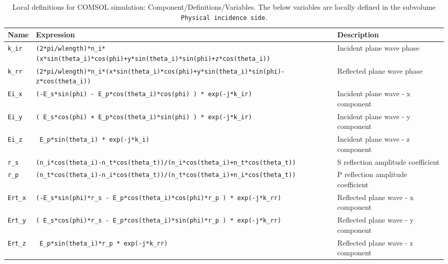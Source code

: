 \begin{sidewaystable}
 \caption{Local definitions for COMSOL simulation: Component/Definitions/Variables. The below variables are locally defined in the subvolume \lstinline!Physical incidence side!. }
 \label{tab:Incident-parameters}
    \centering
    \footnotesize
    \begin{tabular*}{.94\textwidth}{ |l|l|l| }
     \hline
     \textbf{Name}      &   \textbf{Expression}                                                                                 &   \textbf{Description} \\ \hline \hline
     \lstinline!k_ir!   &    \lstinline!(2*pi/wlength)*n_i*(x*sin(theta_i)*cos(phi)+y*sin(theta_i)*sin(phi)+z*cos(theta_i))!     &   Incident plane wave phase          \\
     \lstinline!k_rr!   &    \lstinline!(2*pi/wlength)*n_i*(x*sin(theta_i)*cos(phi)+y*sin(theta_i)*sin(phi)-z*cos(theta_i))!     &   Reflected plane wave phase         \\
     \lstinline!Ei_x!   &   \lstinline!(-E_s*sin(phi) - E_p*cos(theta_i)*cos(phi) ) * exp(-j*k_ir)!                              &   Incident plane wave - x component  \\
     \lstinline!Ei_y!   &   \lstinline!( E_s*cos(phi) + E_p*cos(theta_i)*sin(phi) ) * exp(-j*k_ir)!                              &   Incident plane wave - y component  \\
     \lstinline!Ei_z!   &   \lstinline! E_p*sin(theta_i) * exp(-j*k_i)!                                                         &   Incident  plane wave - z component \\
     \lstinline!r_s!    &   \lstinline!(n_i*cos(theta_i)-n_t*cos(theta_t))/(n_i*cos(theta_i)+n_t*cos(theta_t))!                 &   S reflection amplitude coefficient \\
     \lstinline!r_p!    &   \lstinline!(n_t*cos(theta_i)-n_i*cos(theta_t))/(n_t*cos(theta_i)+n_i*cos(theta_t))!                 &   P reflection amplitude coefficient \\
     \lstinline!Ert_x!  &   \lstinline!(-E_s*sin(phi)*r_s - E_p*cos(theta_i)*cos(phi)*r_p ) * exp(-j*k_rr)!                      &   Reflected plane wave - x component \\
     \lstinline!Ert_y!  &   \lstinline!( E_s*cos(phi)*r_s - E_p*cos(theta_i)*sin(phi)*r_p ) * exp(-j*k_rr)!                      &   Reflected plane wave - y component \\
     \lstinline!Ert_z!  &   \lstinline! E_p*sin(theta_i)*r_p * exp(-j*k_rr)!                                                     &   Reflected plane wave - z component \\

\end{tabular*}
\end{sidewaystable}
